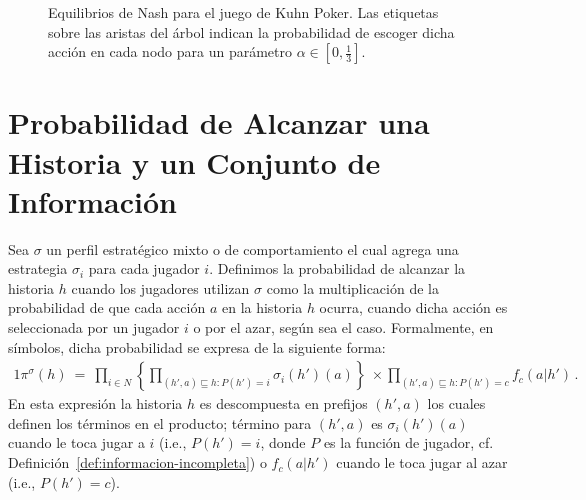 \begin{figure}[h]
\begin{center}
\caption{Equilibrios de Nash para el juego de Kuhn Poker. Las etiquetas sobre las aristas del árbol indican la probabilidad de escoger dicha acción en cada nodo para un parámetro $\alpha \in \left[ 0,\frac{1}{3} \right]$.}
\label{fig:kuhn-poker-estrategias}
\end{center}
\end{figure}


\section{Probabilidad de Alcanzar una Historia y un Conjunto de Información}
\label{sec:probabilidad-historia}

Sea $\sigma$ un perfil estratégico mixto o de comportamiento el cual agrega una estrategia $\sigma_i$ para cada jugador $i$. Definimos la probabilidad de alcanzar la historia $h$ cuando los jugadores utilizan $\sigma$ como la multiplicación de la probabilidad de que cada acción $a$ en la historia $h$ ocurra, cuando dicha acción es seleccionada por un jugador $i$ o por el azar, según sea el caso. Formalmente, en símbolos, dicha probabilidad se expresa de la siguiente forma:
\begin{alignat}{1}
  \pi^\sigma(h)\
    =\ \prod_{i\in N} \left\{ \prod_{(h',a)\sqsubseteq h : P(h')=i} \sigma_i(h')(a) \right\}\ \times \prod_{(h',a)\sqsubseteq h : P(h')=c} f_c(a|h') \,. 
\end{alignat}
En esta expresión la historia $h$ es descompuesta en prefijos $(h',a)$ los cuales definen los términos en el producto; término para $(h',a)$ es $\sigma_i(h')(a)$ cuando le toca jugar a $i$ (i.e., $P(h')=i$, donde $P$ es la función de jugador, cf. Definición~\ref{def:informacion-incompleta}) o $f_c(a|h')$ cuando le toca jugar al azar (i.e., $P(h')=c$).

